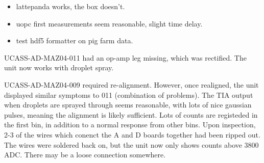 

\begin{itemize}
\item lattepanda works, the box doesn't.
\item uopc first measurements seem reasonable, slight time delay.
\item test hdf5 formatter on pig farm data.
\end{itemize}


UCASS-AD-MAZ04-011 had an op-amp leg missing, which was rectified. The unit now works with droplet spray.

UCASS-AD-MAZ04-009 required re-alignment. However, once realigned, the unit displayed similar symptoms to 011 (combination of problems). The TIA output when droplets are sprayed through seems reasonable, with lots of nice gaussian pulses, meaning the alignment is likely sufficient. Lots of counts are registeded in the first bin, in addition to a normal response from other bins. Upon inspection, 2-3 of the wires which conenct the A and D boards together had been ripped out. The wires were soldered back on, but the unit now only shows counts above 3800 ADC. There may be a loose connection somewhere.
